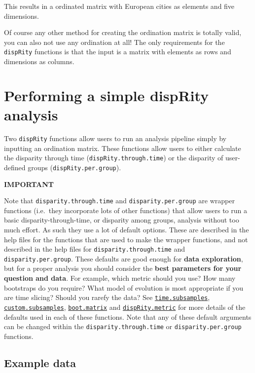 \documentclass[]{book}
\theoremstyle{definition}
\theoremstyle{definition}
\theoremstyle{remark}
\begin{document}
This results in a ordinated matrix with European cities as elements and
five dimensions.

Of course any other method for creating the ordination matrix is totally
valid, you can also not use any ordination at all! The only requirements
for the \texttt{dispRity} functions is that the input is a matrix with
elements as rows and dimensions as columns.

\section{Performing a simple dispRity
analysis}\label{performing-a-simple-disprity-analysis}

Two \texttt{dispRity} functions allow users to run an analysis pipeline
simply by inputting an ordination matrix. These functions allow users to
either calculate the disparity through time
(\texttt{dispRity.through.time}) or the disparity of user-defined groups
(\texttt{dispRity.per.group}).

\textbf{IMPORTANT}

Note that \texttt{disparity.through.time} and
\texttt{disparity.per.group} are wrapper functions (i.e.~they
incorporate lots of other functions) that allow users to run a basic
disparity-through-time, or disparity among groups, analysis without too
much effort. As such they use a lot of default options. These are
described in the help files for the functions that are used to make the
wrapper functions, and not described in the help files for
\texttt{disparity.through.time} and \texttt{disparity.per.group}. These
defaults are good enough for \textbf{data exploration}, but for a proper
analysis you should consider the \textbf{best parameters for your
question and data}. For example, which metric should you use? How many
bootstraps do you require? What model of evolution is most appropriate
if you are time slicing? Should you rarefy the data? See
\protect\hyperlink{time-slicing}{\texttt{time.subsamples}},
\protect\hyperlink{customised-subsamples}{\texttt{custom.subsamples}},
\protect\hyperlink{bootstraps-and-rarefactions}{\texttt{boot.matrix}}
and \protect\hyperlink{disparity-metrics}{\texttt{dispRity.metric}} for
more details of the defaults used in each of these functions. Note that
any of these default arguments can be changed within the
\texttt{disparity.through.time} or \texttt{disparity.per.group}
functions.

\hypertarget{example-data}{\subsection{Example
data}\label{example-data}}
\end{document}
